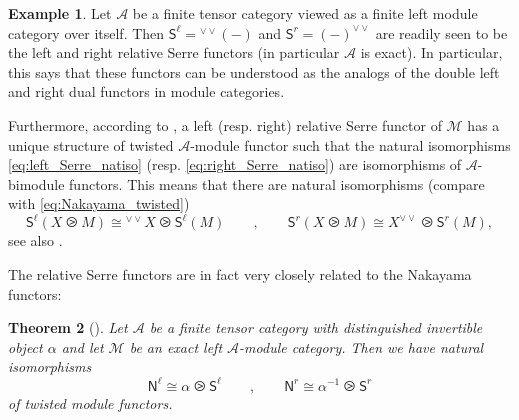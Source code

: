 \documentclass[11pt]{article}
\newcommand{\cA}{\mathcal{A}}
\newtheorem{theorem}{Theorem}[section]
\newtheorem{corollary}[theorem]{Corollary}
\theoremstyle{definition}
\newtheorem{example}[theorem]{Example}
\begin{document}
\begin{example}\label{ex:Serre_funct_in_ftc}
Let $\mathcal{A}$ be a finite tensor category viewed as a finite left module category over itself. Then  $\mathsf{S}^\ell = {}^{\vee \vee}(-)$ and  $\mathsf{S}^r = (-)^{\vee \vee}$ are readily seen to be  the left and right relative Serre functors (in particular $\mathcal{A}$ is exact). In particular, this says that these functors can be understood as the analogs of the double left and right dual functors in module categories.
\end{example}

Furthermore, according to \cite[\S 3.3]{relserre}, a left (resp. right) relative Serre functor of $\mathcal{M}$ has a unique structure of twisted $\mathcal{A}$-module functor such that the natural isomorphisms \eqref{eq:left_Serre_natiso} (resp.  \eqref{eq:right_Serre_natiso}) are isomorphisms of $\mathcal{A}$-bimodule functors. This means that there are natural isomorphisms (compare with \eqref{eq:Nakayama_twisted})
\begin{equation}\label{eq:Serre_twisted}
\mathsf{S}^\ell(X \ogreaterthan M) \cong {}^{\vee \vee} X 	\ogreaterthan  \mathsf{S}^\ell( M) \qquad , \qquad \mathsf{S}^r(X \ogreaterthan M) \cong  X^{\vee \vee} 	\ogreaterthan  \mathsf{S}^r( M),
\end{equation}
see also \cite[Lemma 4.23]{fss}.


The relative Serre functors are in fact very closely related to the Nakayama functors:

\begin{theorem}[{\cite[Theorem 4.26]{fss}}]
Let $\mathcal{A}$ be a finite tensor category with distinguished invertible object $\alpha$ and let $\mathcal{M}$ be an exact left $\mathcal{A}$-module category. Then we have natural isomorphisms
$$ \mathsf{N}^\ell \cong \alpha \ogreaterthan  \mathsf{S}^\ell \qquad , \qquad  \mathsf{N}^r \cong \alpha^{-1} \ogreaterthan  \mathsf{S}^r $$
of twisted module functors.
\end{theorem}


\end{document}
